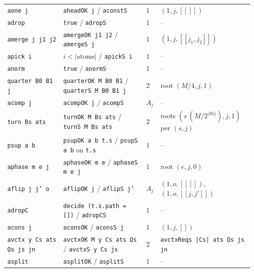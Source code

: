 \begin{xltabular}{\textwidth}{@{}>{\raggedright\arraybackslash}p{3.7cm}>{\raggedright\arraybackslash}X>{\raggedright\arraybackslash}p{1.5cm}>{\raggedright\arraybackslash}p{3.9cm}@{}}
\textnormal{\texttt{aone j}} & \textnormal{\texttt{aheadOK j}} / \textnormal{\texttt{aconstS}} & $1$ & $(1,j,[[]])$\\
\textnormal{\texttt{adrop}} & \textnormal{\texttt{true}} / \textnormal{\texttt{adropS}} & $1$ & --\\
\textnormal{\texttt{amerge j j1 j2}} & \textnormal{\texttt{amergeOK j1 j2}} / \textnormal{\texttt{amergeS j}} & $1$ & $(1,j,[[j_1,j_2]])$\\
\textnormal{\texttt{apick i}} & $i<|\text{atoms}|$ / \textnormal{\texttt{apickS i}} & $1$ & --\\
\textnormal{\texttt{anorm}} & \textnormal{\texttt{true}} / \textnormal{\texttt{anormS}} & $1$ & --\\
\textnormal{\texttt{quarter B0 B1 j}} & \textnormal{\texttt{quarterOK M B0 B1}} / \textnormal{\texttt{quarterS M B0 B1 j}} & $2$ & root $(M/4, j, 1)$\\
\textnormal{\texttt{acomp j}} & \textnormal{\texttt{acompOK j}} / \textnormal{\texttt{acompS}} & $A_j$ & --\\
\textnormal{\texttt{turn Bs ats}} & \textnormal{\texttt{turnOK M Bs ats}} / \textnormal{\texttt{turnS M Bs ats}} & $2$ & roots $(s\,(M/2^{|Bs|}), j, 1)$ per $(s,j)$\\
\textnormal{\texttt{psup a b}} & \textnormal{\texttt{psupOK a b t.\allowbreak{}s}} / \textnormal{\texttt{psupS a b}} on \textnormal{\texttt{t.\allowbreak{}s}} & $1$ & --\\
\textnormal{\texttt{aphase m e j}} & \textnormal{\texttt{aphaseOK m e}} / \textnormal{\texttt{aphaseS m e j}} & $1$ & root $(e,j,0)$\\
\textnormal{\texttt{aflip j j' o}} & \textnormal{\texttt{aflipOK j}} / \textnormal{\texttt{aflipS j'}} & $A_j$ & $(1,o,[[]])$, $(1,o,[[j,j']])$\\
\textnormal{\texttt{adropC}} & \textnormal{\texttt{decide (\allowbreak{}t.\allowbreak{}s.\allowbreak{}path = [])}} / \textnormal{\texttt{adropCS}} & $1$ & --\\
\textnormal{\texttt{acons j}} & \textnormal{\texttt{aconsOK}} / \textnormal{\texttt{aconsS j}} & $1$ & $(1,j,[])$\\
\textnormal{\texttt{avctx y Cs ats Qs js jn}} & \textnormal{\texttt{avctxOK M y Cs ats Qs}} / \textnormal{\texttt{avctxS y Cs js}} & $2$ & \textnormal{\texttt{avctxReqs |Cs| ats Qs js jn}}\\
\textnormal{\texttt{asplit}} & \textnormal{\texttt{asplitOK}} / \textnormal{\texttt{asplitS}} & $1$ & --\\
\bottomrule
\end{xltabular}

